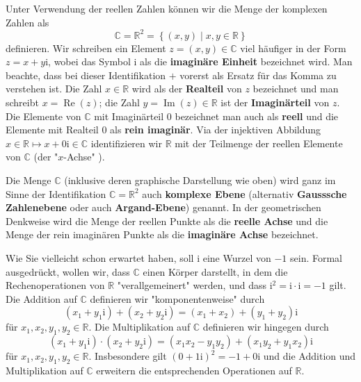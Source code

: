 \documentclass[../Analysis1_script.tex]{subfiles}
\begin{document}
Unter Verwendung der reellen Zahlen können wir die Menge der komplexen Zahlen als
\begin{equation}
	\mathbb {C} = \mathbb {R}^2 = \left \lbrace {(x,y)} \mid {x,y\in \mathbb {R}}\right \rbrace
\end{equation}
	definieren. Wir schreiben ein Element $z = (x,y) \in \mathbb {C}$ viel häufiger in der Form $z = x+y\mathrm{i}$, wobei das Symbol $\mathrm{i}$ als die \textbf{imaginäre Einheit} bezeichnet wird. Man beachte, dass bei dieser Identifikation $+$ vorerst als Ersatz für das Komma zu verstehen ist. Die Zahl $x \in \mathbb {R}$ wird als der \textbf{Realteil} von $z$ bezeichnet und man schreibt $x = \operatorname {Re}(z)$; die Zahl $y = \operatorname {Im}(z) \in \mathbb {R}$ ist der \textbf{Imaginärteil} von $z$. Die Elemente von $\mathbb {C}$ mit Imaginärteil $0$ bezeichnet man auch als \textbf{reell} und die Elemente mit Realteil $0$ als \textbf{rein imaginär}. Via der injektiven Abbildung $x\in \mathbb {R} \mapsto x+0\mathrm{i} \in \mathbb {C}$ identifizieren wir $\mathbb {R}$ mit der Teilmenge der reellen Elemente von $\mathbb {C}$ (der "$x$-Achse" ).

	

	Die Menge $\mathbb {C}$ (inklusive deren graphische Darstellung wie oben) wird ganz im Sinne der Identifikation $\mathbb {C} = \mathbb {R}^2$ auch \textbf{komplexe Ebene} (alternativ \textbf{Gausssche Zahlenebene} oder auch \textbf{Argand-Ebene}) genannt. In der geometrischen Denkweise wird die Menge der reellen Punkte als die \textbf{reelle Achse} und die Menge der rein imaginären Punkte als die \textbf{imaginäre Achse} bezeichnet.
	
	Wie Sie vielleicht schon erwartet haben, soll $\mathrm{i}$ eine Wurzel von $-1$ sein. Formal ausgedrückt, wollen wir, dass $\mathbb {C}$ einen Körper darstellt, in dem die Rechenoperationen von $\mathbb {R}$ "verallgemeinert" werden, und dass $\mathrm {i}^2 = \mathrm{i} \cdot \mathrm{i} = -1$ gilt. Die Addition auf $\mathbb {C}$ definieren wir "komponentenweise" durch
	\begin{equation}
		(x_1+y_1\mathrm{i}) + (x_2+y_2\mathrm{i}) = (x_1+x_2) + (y_1+y_2)\mathrm{i}
	\end{equation}  
	für $x_1,x_2,y_1,y_2 \in \mathbb {R}$. Die Multiplikation auf $\mathbb{C}$ definieren wir hingegen durch 
	\begin{equation}
		(x_1+y_1\mathrm {i})\cdot (x_2+y_2\mathrm {i}) = (x_1x_2-y_1y_2) + (x_1y_2+y_1x_2)\mathrm {i}
	\end{equation}
	für $x_1,x_2,y_1,y_2 \in \mathbb {R}$. Insbesondere gilt $(0+1 \mathrm {i})^2 = -1+0\mathrm {i}$ und die Addition und Multiplikation auf $\mathbb {C}$ erweitern die entsprechenden Operationen auf $\mathbb {R}$.
	
\end{document}
